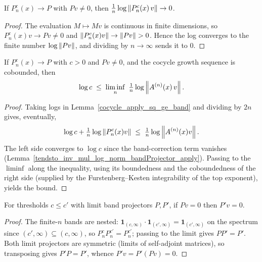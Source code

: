 \begin{lemma}\label{tendsto_inv_mul_log_norm_bandProjector_apply}
  \leanok
  If \(P^{c}_n(x)\to P\) with \(Pv\neq0\), then
  \(\tfrac1n\log\left\lVert P^{c}_n(x)\,v \right\rVert\to 0\).
\end{lemma}
\begin{proof}\leanok
  The evaluation \(M\mapsto Mv\) is continuous in finite dimensions, so \(P^{c}_n(x)v\to Pv\neq0\)
  and \(\left\lVert P^{c}_n(x)v \right\rVert\to\left\lVert Pv \right\rVert>0\). Hence the log converges to the finite number
  \(\log\left\lVert Pv \right\rVert\), and dividing by \(n\to\infty\) sends it to \(0\).
\end{proof}

\begin{proposition}\label{log_le_liminf_log_cocycle_apply}
  \leanok
  If \(P^{c}_n(x)\to P\) with \(c>0\) and \(Pv\neq0\), and the cocycle growth sequence is
  cobounded, then
  \[
    \log c \;\le\; \liminf_{n}\ \tfrac1n\log\norm{A^{(n)}(x)\,v}.
  \]
\end{proposition}
\begin{proof}\leanok
  Taking logs in Lemma~\ref{cocycle_apply_sq_ge_band} and dividing by \(2n\) gives, eventually,
  \[
    \log c + \tfrac1n\log\left\lVert P^{c}_n(x)v \right\rVert \;\le\; \tfrac1n\log\left\lVert A^{(n)}(x)v \right\rVert.
  \]
  The left side converges to \(\log c\) since the band-correction term vanishes
  (Lemma~\ref{tendsto_inv_mul_log_norm_bandProjector_apply}). Passing to the \(\liminf\) along the
  inequality, using its boundedness and the coboundedness of the right side (supplied by the
  Furstenberg--Kesten integrability of the top exponent), yields the bound.
\end{proof}

\begin{lemma}\label{limitBandProjector_apply_eq_zero_of_le}
  \leanok
  For thresholds \(c\le c'\) with limit band projectors \(P,P'\), if \(Pv=0\) then \(P'v=0\).
\end{lemma}
\begin{proof}\leanok
  The finite-\(n\) bands are nested: \(\mathbf 1_{(c,\infty)}\cdot\mathbf 1_{(c',\infty)}=
  \mathbf 1_{(c',\infty)}\) on the spectrum since \((c',\infty)\subseteq(c,\infty)\), so
  \(P^{c}_n P^{c'}_n = P^{c'}_n\); passing to the limit gives \(PP'=P'\). Both limit projectors are
  symmetric (limits of self-adjoint matrices), so transposing gives \(P'P=P'\), whence
  \(P'v = P'(Pv) = 0\).
\end{proof}

